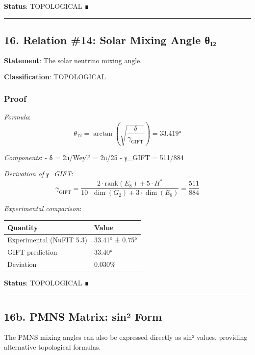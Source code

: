 \documentclass[11pt,a4paper]{article}
\begin{document}
\textbf{Status}: TOPOLOGICAL ∎

\begin{center}\rule{0.5\linewidth}{0.5pt}\end{center}

\subsection{16. Relation \#14: Solar Mixing Angle θ₁₂}\label{relation-14-solar-mixing-angle-ux3b8ux2081ux2082}

\textbf{Statement}: The solar neutrino mixing angle.

\textbf{Classification}: TOPOLOGICAL

\subsubsection{Proof}\label{proof-18}

\emph{Formula}:
\[\theta_{12} = \arctan\left(\sqrt{\frac{\delta}{\gamma_{\text{GIFT}}}}\right) = 33.419°\]

\emph{Components}:
- δ = 2π/Weyl² = 2π/25
- γ\_GIFT = 511/884

\emph{Derivation of γ\_GIFT}:
\[\gamma_{\text{GIFT}} = \frac{2 \cdot \text{rank}(E_8) + 5 \cdot H^*}{10 \cdot \dim(G_2) + 3 \cdot \dim(E_8)} = \frac{511}{884}\]

\emph{Experimental comparison}:

{\def\LTcaptype{none} %
\begin{longtable}[]{@{}ll@{}}
\toprule\noalign{}
Quantity & Value \\
\midrule\noalign{}
\endhead
\bottomrule\noalign{}
\endlastfoot
Experimental (NuFIT 5.3) & 33.41° ± 0.75° \\
GIFT prediction & 33.40° \\
Deviation & 0.030\% \\
\end{longtable}
}

\textbf{Status}: TOPOLOGICAL ∎

\begin{center}\rule{0.5\linewidth}{0.5pt}\end{center}

\subsection{16b. PMNS Matrix: sin² Form}\label{b.-pmns-matrix-sinuxb2-form}

The PMNS mixing angles can also be expressed directly as sin² values, providing alternative topological formulas.
\end{document}
